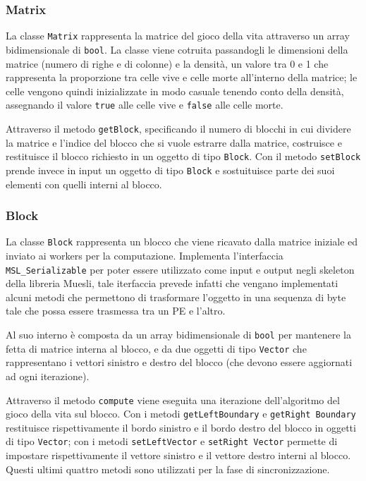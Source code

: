 \subsubsection*{Matrix}
La classe \texttt{Matrix} rappresenta la matrice del gioco della vita attraverso un array bidimensionale di \texttt{bool}. La classe viene cotruita passandogli le dimensioni della matrice (numero di righe e di colonne) e la densit\`a, un valore tra 0 e 1 che rappresenta la proporzione tra celle vive e celle morte all'interno della matrice; le celle vengono quindi inizializzate in modo casuale tenendo conto della densit\`a, assegnando il valore \texttt{true} alle celle vive e \texttt{false} alle celle morte.

Attraverso il metodo \texttt{getBlock}, specificando il numero di blocchi in cui dividere la matrice e l'indice del blocco che si vuole estrarre dalla matrice, costruisce e restituisce il blocco richiesto in un oggetto di tipo \texttt{Block}. Con il metodo \texttt{setBlock} prende invece in input un oggetto di tipo \texttt{Block} e sostuituisce parte dei suoi elementi con quelli interni al blocco.

\subsubsection*{Block}
La classe \texttt{Block} rappresenta un blocco che viene ricavato dalla matrice iniziale ed inviato ai workers per la computazione. Implementa l'interfaccia \texttt{MSL\_Serializable} per poter essere utilizzato come input e output negli skeleton della libreria Muesli, tale iterfaccia prevede infatti che vengano implementati alcuni metodi che permettono di trasformare l'oggetto in una sequenza di byte tale che possa essere trasmessa tra un PE e l'altro.

Al suo interno \`e composta da un array bidimensionale di \texttt{bool} per mantenere la fetta di matrice interna al blocco, e da due oggetti di tipo \texttt{Vector} che rappresentano i vettori sinistro e destro del blocco (che devono essere aggiornati ad ogni iterazione).

Attraverso il metodo \texttt{compute} viene eseguita una iterazione dell'algoritmo del gioco della vita sul blocco. Con i metodi \texttt{getLeftBoundary} e \texttt{getRight Boundary} restituisce rispettivamente il bordo sinistro e il bordo destro del blocco in oggetti di tipo \texttt{Vector}; con i metodi \texttt{setLeftVector} e \texttt{setRight Vector} permette di impostare rispettivamente il vettore sinistro e il vettore destro interni al blocco. Questi ultimi quattro metodi sono utilizzati per la fase di sincronizzazione.

